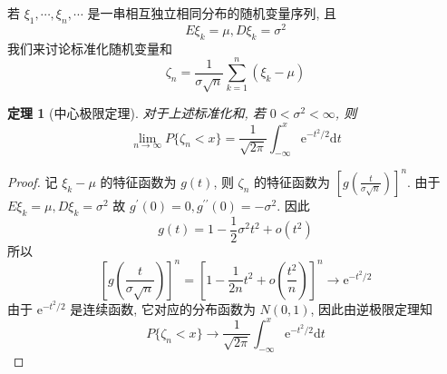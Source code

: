 \documentclass[12pt,a4paper]{article}
\newtheorem{thm}{定理}[subsection]  %
\begin{document}
若 $\xi_1, \cdots, \xi_n, \cdots$ 是一串相互独立相同分布的随机变量序列, 且 \[E\xi_k = \mu, D \xi_k = \sigma^2\]
我们来讨论标准化随机变量和 \[\zeta_n = \frac{1}{\sigma \sqrt{n}} \sum\limits_{k=1}^n (\xi_k - \mu)\]

\begin{thm}[中心极限定理]
    对于上述标准化和, 若 $0 < \sigma^2 < \infty$, 则
    \[\lim_{n \to \infty} P\{\zeta_n < x\} = \frac{1}{\sqrt{2\pi}} \int_{-\infty}^x \mathrm{e}^{-t^2/2} \mathrm{d} t\]
\end{thm}

\begin{proof}
    记 $\xi_k - \mu$ 的特征函数为 $g(t)$, 则 $\zeta_n$ 的特征函数为 $\left[g\left( \frac{t}{\sigma \sqrt{n}} \right)\right]^n$. 
    由于 $E \xi_k = \mu, D \xi_k = \sigma^2$ 故 $g^{\prime}(0) = 0, g^{\prime \prime}(0) = -\sigma^2$. 因此
    \[g(t) = 1 -\frac{1}{2}\sigma^2 t^2 + o(t^2)\]
    所以 \[ \left[g \left( \frac{t}{\sigma \sqrt{n}} \right)\right]^n = \left[ 1 - \frac{1}{2n} t^2 + o(\frac{t^2}{n}) \right]^n \to \mathrm{e}^{-t^2/2} \]
    由于 $\mathrm{e}^{-t^2/2}$ 是连续函数, 它对应的分布函数为 $N(0,1)$, 因此由逆极限定理知
    \[P\{ \zeta_n < x\} \to \frac{1}{\sqrt{2\pi}} \int_{-\infty}^x \mathrm{e}^{-t^2/2} \mathrm{d}t\]
\end{proof}
\end{document}
